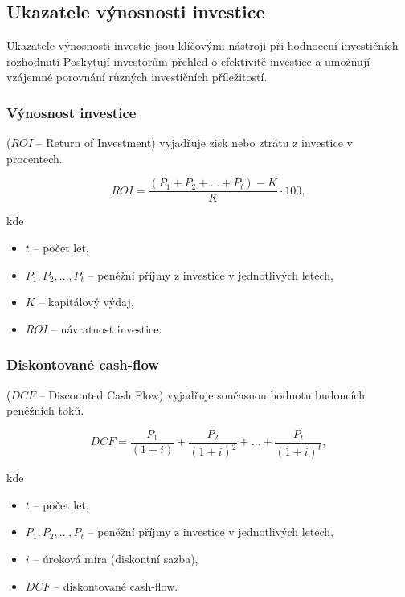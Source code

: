 \subsection{Ukazatele výnosnosti investice}

Ukazatele výnosnosti investic jsou klíčovými nástroji při hodnocení investičních rozhodnutí
Poskytují investorům přehled o efektivitě investice a umožňují vzájemné porovnání různých investičních příležitostí.



\subsubsection{Výnosnost investice}
($ROI$ -- Return of Investment)
vyjadřuje zisk nebo ztrátu z investice v procentech.

\begin{equation}
    ROI = \frac{(P_1 + P_2 + \ldots + P_t) - K}{K} \cdot 100,
\end{equation}

kde
\begin{itemize}[label={}]
    \item $t$ -- počet let,
    \item $P_1, P_2, \ldots, P_t$ -- peněžní příjmy z investice v jednotlivých letech,
    \item $K$ -- kapitálový výdaj,
    \item $ROI$ -- návratnost investice.
\end{itemize}

\subsubsection{Diskontované cash-flow}
($DCF$ -- Discounted Cash Flow)
vyjadřuje současnou hodnotu budoucích peněžních toků.

\begin{equation}
    DCF = \frac{P_1}{(1+i)} + \frac{P_2}{(1+i)^2} + \ldots + \frac{P_t}{(1+i)^t},
\end{equation}

kde
\begin{itemize}[label={}]
    \item $t$ -- počet let,
    \item $P_1, P_2, \ldots, P_t$ -- peněžní příjmy z investice v jednotlivých letech,
    \item $i$ -- úroková míra (diskontní sazba),
    \item $DCF$ -- diskontované cash-flow.
\end{itemize}

